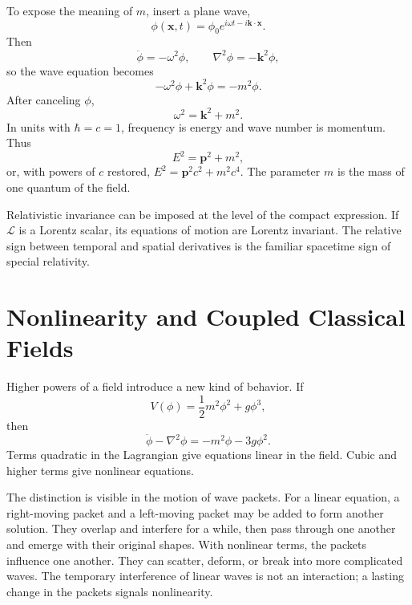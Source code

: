 To expose the meaning of \(m\), insert a plane wave,
\begin{equation}
\phi(\mathbf x,t)=\phi_0e^{i\omega t-i\mathbf k\cdot\mathbf x}.
\end{equation}
Then
\begin{equation}
\ddot\phi=-\omega^2\phi,
\qquad
\nabla^2\phi=-\mathbf k^2\phi,
\end{equation}
so the wave equation becomes
\begin{equation}
-\omega^2\phi+\mathbf k^2\phi=-m^2\phi.
\end{equation}
After canceling \(\phi\),
\begin{equation}
\omega^2=\mathbf k^2+m^2.
\end{equation}
In units with \(\hbar=c=1\), frequency is energy and wave number is momentum. Thus
\begin{equation}
E^2=\mathbf p^2+m^2,
\end{equation}
or, with powers of \(c\) restored, \(E^2=\mathbf p^2c^2+m^2c^4\). The parameter \(m\) is the mass of one quantum of the field.

Relativistic invariance can be imposed at the level of the compact expression. If \(\mathcal L\) is a Lorentz scalar, its equations of motion are Lorentz invariant. The relative sign between temporal and spatial derivatives is the familiar spacetime sign of special relativity.

\section{Nonlinearity and Coupled Classical Fields}

Higher powers of a field introduce a new kind of behavior. If
\begin{equation}
V(\phi)=\frac12m^2\phi^2+g\phi^3,
\end{equation}
then
\begin{equation}
\ddot\phi-\nabla^2\phi=-m^2\phi-3g\phi^2.
\end{equation}
Terms quadratic in the Lagrangian give equations linear in the field. Cubic and higher terms give nonlinear equations.

The distinction is visible in the motion of wave packets. For a linear equation, a right-moving packet and a left-moving packet may be added to form another solution. They overlap and interfere for a while, then pass through one another and emerge with their original shapes. With nonlinear terms, the packets influence one another. They can scatter, deform, or break into more complicated waves. The temporary interference of linear waves is not an interaction; a lasting change in the packets signals nonlinearity.

